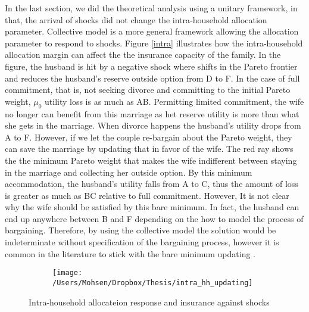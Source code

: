 In the last section, we did the theoretical analysis using a unitary framework, in that, the arrival of shocks did not change the intra-household allocation parameter. Collective model is a more general framework allowing the allocation parameter to respond to shocks. Figure \ref{intra} illustrates how the intra-household allocation margin can affect the the insurance capacity of the family. In the figure, the husband is hit by a negative shock where shifts in the Pareto frontier and reduces the husband's reserve outside option from D to F. In the case of full commitment, that is, not seeking divorce and committing to the initial Pareto weight, $\mu_0$ utility loss is as much as AB. Permitting limited commitment, the wife no longer can benefit from this marriage as het reserve utility is more than what she gets in the marriage. When divorce happens the husband's utility drops from A to F. However, if we let the couple re-bargain about the Pareto weight, they can save the marriage by updating that in favor of the wife. The red ray shows the the minimum Pareto weight that makes the wife indifferent  between staying in the marriage and collecting her outside option. By this minimum accommodation, the husband's utility falls from A to C, thus the amount of loss is greater as much as BC relative to full commitment. However, It is not clear why the wife should be satisfied by this bare minimum. In fact, the husband can end up anywhere between B and F depending on the how to model the process of bargaining. Therefore, by using the collective model the solution would be indeterminate without specification of the bargaining process, however it is common in the literature to stick with the bare minimum updating \citep{Chiappori_Mazzocco_2014}. \\


\begin{figure}
\centering
\begin{subfigure}{0.65\columnwidth}
\texttt{[image: /Users/Mohsen/Dropbox/Thesis/intra\_hh\_updating]}
\label{fig: intra}
\end{subfigure}
\qquad
\caption{Intra-household allocateion response and insurance against shocks}
\label{intra_hh}
\end{figure}



